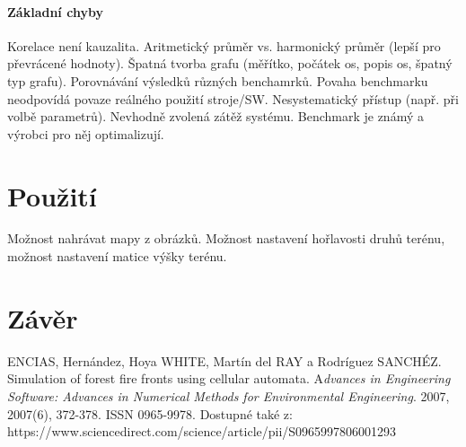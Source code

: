 \documentclass[11pt,a4paper]{scrartcl}
\begin{document}
	
	\paragraph{Základní chyby} Korelace není kauzalita. Aritmetický průměr vs. harmonický průměr (lepší pro převrácené hodnoty). Špatná tvorba grafu (měřítko, počátek os, popis os, špatný typ grafu). Porovnávání výsledků různých benchamrků. Povaha benchmarku neodpovídá povaze reálného použití stroje/SW. Nesystematický přístup (např. při volbě parametrů). Nevhodně zvolená zátěž systému. Benchmark je známý a výrobci pro něj optimalizují.
	
	\section{Použití}
	Možnost nahrávat mapy z obrázků. Možnost nastavení hořlavosti druhů terénu, možnost nastavení matice výšky terénu.
	
	\section{Závěr}
	
	\begin{thebibliography}{9}
		
		ENCIAS, Hernández, Hoya WHITE, Martín del RAY a Rodríguez SANCHÉZ. Simulation of forest fire fronts using cellular automata. A\textit{dvances in Engineering Software: Advances in Numerical Methods for Environmental Engineering}. 2007, 2007(6), 372-378. ISSN 0965-9978. Dostupné také z: https://www.sciencedirect.com/science/article/pii/S0965997806001293
	\end{thebibliography}
	
\end{document}
